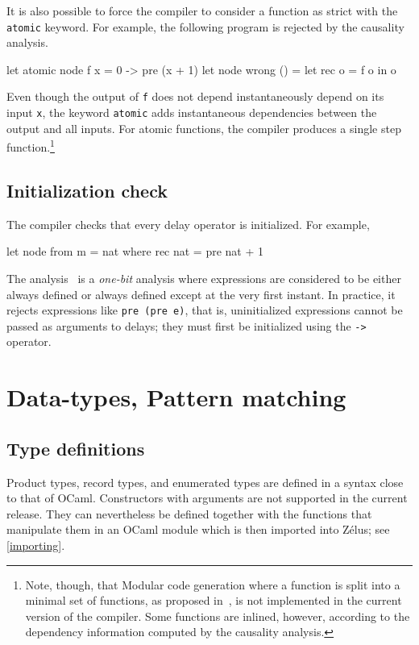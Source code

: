 \documentclass[11pt,titlepage,twoside]{report}
\makeatletter
\newcommand{\zls}[1]{{\@span{class="zelusinline"}#1}}
\newcommand{\zls}[1]{\texttt{#1}}
\renewcommand{\zls}[1]{\texttt{#1}}
\newcommand{\zelus}{{\sf Z\'elus}}
\newcommand{\ocaml}{{\sf OCaml}}
\makeatother
\begin{document}
It is also possible to force the compiler to consider a function as strict 
with the \zls{atomic} keyword. For example, the following program is
rejected by the causality analysis.
%
\begin{chklisting}
let atomic node f x = 0 -> pre (x + 1)
let node wrong () =
  let rec o = f o in o
\end{chklisting}
%
Even though the output of \zls{f} does not depend instantaneously
depend on its input \zls{x}, the keyword \zls{atomic} adds instantaneous 
dependencies between the output and all inputs.
For atomic functions, the compiler produces a single step
function.\footnote{Note, though, that Modular code generation
  where a function is split into a minimal set of functions, as
  proposed in~\cite{lucy:emsoft09,lustre:tripakis-popl09}, is not
  implemented in the current version of the compiler. Some functions
  are inlined, however, according to the dependency information
  computed by the causality analysis.}

\subsection{Initialization check\label{initcheck}} %

The compiler checks that every delay operator is initialized. For
example,
\begin{chklisting}
let node from m = nat where
  rec nat = pre nat + 1
\end{chklisting}
The analysis~\cite{lucy:sttt04} is a {\em one-bit} analysis where 
expressions are considered to be either always defined or always defined 
except at the very first instant.
In practice, it rejects expressions like \zls{pre (pre e)}, that is,
uninitialized expressions cannot be passed as arguments to delays; they must 
first be initialized using the \zls{->} operator.

\section{Data-types, Pattern matching\label{dtypespatterns}} %
\subsection{Type definitions\label{typedef}} %

Product types, record types, and enumerated types are defined in a syntax 
close to that of \ocaml.
Constructors with arguments are not supported in the current release.
They can nevertheless be defined together with the functions that manipulate 
them in an \ocaml{} module which is then imported into \zelus; see 
\cref{importing}.
\end{document}
